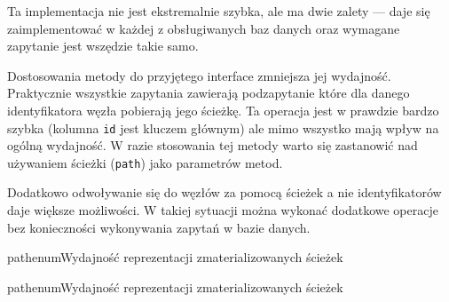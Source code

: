 Ta implementacja nie jest ekstremalnie szybka, ale ma dwie zalety ---
daje się zaimplementować w każdej z obsługiwanych baz danych oraz wymagane zapytanie jest wszędzie takie samo.















Dostosowania metody do przyjętego interface zmniejsza jej wydajność.
Praktycznie wszystkie zapytania zawierają podzapytanie które dla danego identyfikatora węzła  pobierają jego ścieżkę.
Ta operacja jest w prawdzie bardzo szybka (kolumna \texttt{id} jest kluczem głównym) ale mimo wszystko mają wpływ na ogólną wydajność.
W razie stosowania tej metody warto się zastanowić nad używaniem ścieżki (\texttt{path}) jako parametrów metod. 

Dodatkowo odwoływanie się do węzłów za pomocą ścieżek a nie identyfikatorów daje większe możliwości.
W takiej sytuacji można wykonać dodatkowe operacje bez konieczności wykonywania zapytań w bazie danych.


\begin{qxtab}{pathenum}{Wydajność reprezentacji zmaterializowanych ścieżek}
\end{qxtab}

\begin{qxfig}{pathenum}{Wydajność reprezentacji zmaterializowanych ścieżek}
\end{qxfig}


